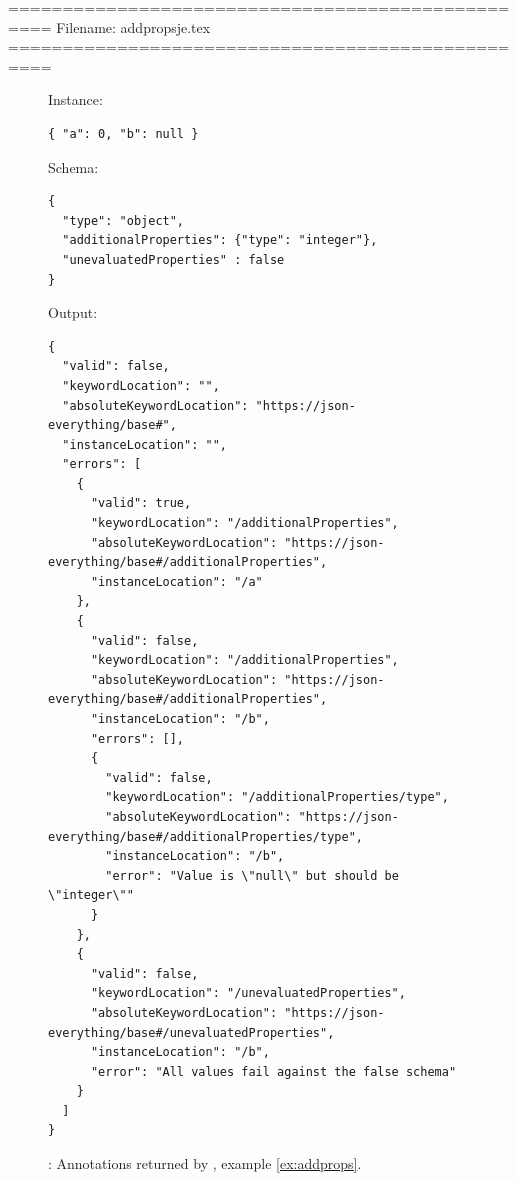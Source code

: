 ==================================================
Filename: addpropsje.tex
==================================================
\begin{figure}
\small

Instance:
\begin{querybox}{}
\begin{lstlisting}[style=querynonumbers]
{ "a": 0, "b": null }
\end{lstlisting}
\end{querybox}


Schema:
\begin{querybox}{}
\begin{lstlisting}[style=query]
{
  "type": "object",
  "additionalProperties": {"type": "integer"},
  "unevaluatedProperties" : false
}
\end{lstlisting}
\end{querybox}


Output:
\begin{querybox}{}
\begin{lstlisting}[style=query]
{
  "valid": false,
  "keywordLocation": "",
  "absoluteKeywordLocation": "https://json-everything/base#",
  "instanceLocation": "",
  "errors": [
    {
      "valid": true,
      "keywordLocation": "/additionalProperties",
      "absoluteKeywordLocation": "https://json-everything/base#/additionalProperties",
      "instanceLocation": "/a"
    },
    {
      "valid": false,
      "keywordLocation": "/additionalProperties",
      "absoluteKeywordLocation": "https://json-everything/base#/additionalProperties",
      "instanceLocation": "/b",
      "errors": [],
      {
        "valid": false,
        "keywordLocation": "/additionalProperties/type",
        "absoluteKeywordLocation": "https://json-everything/base#/additionalProperties/type",
        "instanceLocation": "/b",
        "error": "Value is \"null\" but should be \"integer\""
      }
    },
    {
      "valid": false,
      "keywordLocation": "/unevaluatedProperties",
      "absoluteKeywordLocation": "https://json-everything/base#/unevaluatedProperties",
      "instanceLocation": "/b",
      "error": "All values fail against the false schema"
    }
  ]
}
\end{lstlisting}
\end{querybox}

\caption{{\qunProps}: Annotations returned by {\JE}, example \ref{ex:addprops}.}
\label{fig:addpropsje}
\end{figure}



